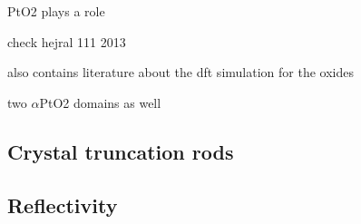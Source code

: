 PtO2 plays a role \cite{McCabe1986, HANNEVOLD2005}

check hejral 111 2013

also contains literature about the dft simulation for the oxides

two $\alpha$PtO2 domains as well

\subsection{Crystal truncation rods}

\subsection{Reflectivity}
